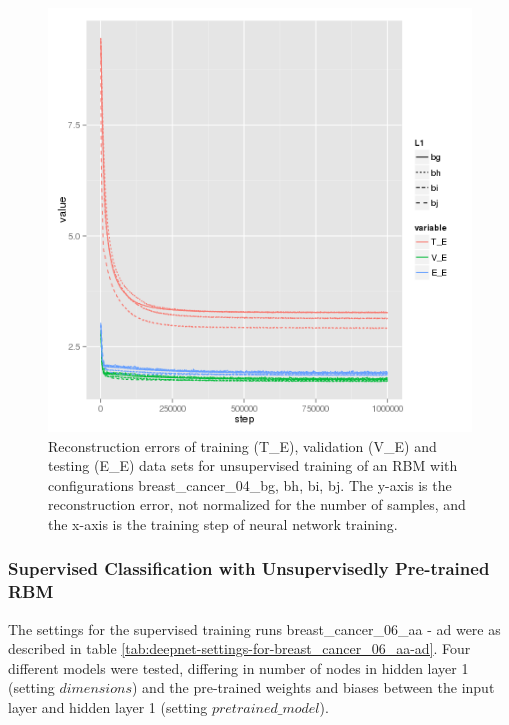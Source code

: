 \begin{figure}
\begin{centering}
\includegraphics[width=0.35\columnwidth]{images/breast_cancer_04-plot-bg_bj}
\par\end{centering}
\caption[Reconstruction error of training, validation and testing data sets.]{\label{fig:reconstruction-errors-of-breast_cancer_04_bg-bj}Reconstruction
errors of training (T\_E), validation (V\_E) and testing (E\_E) data
sets for unsupervised training of an RBM with configurations breast\_cancer\_04\_bg,
bh, bi, bj. The y-axis is the reconstruction error, not normalized
for the number of samples, and the x-axis is the training step of
neural network training.}
\end{figure}

\subsubsection{Supervised Classification with Unsupervisedly Pre-trained RBM}

The settings for the supervised training runs breast\_cancer\_06\_aa
- ad were as described in table \ref{tab:deepnet-settings-for-breast_cancer_06_aa-ad}.
Four different models were tested, differing in number of nodes in
hidden layer 1 (setting $dimensions$) and the pre-trained weights
and biases between the input layer and hidden layer 1 (setting $pretrained\textrm{\_}model$).

